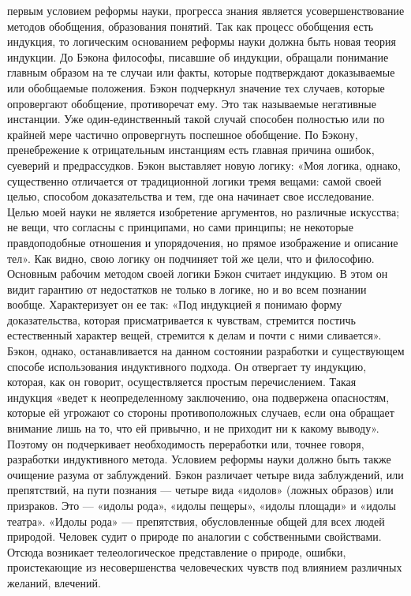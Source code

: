 \documentclass[12pt]{article}
\begin{document}
первым условием реформы науки, прогресса знания является усовершенствование методов обобщения, образования понятий.
Так как процесс обобщения есть индукция, то логическим основанием реформы науки должна 
быть новая теория индукции.
До Бэкона философы, писавшие об индукции, обращали понимание главным образом на те случаи или
факты, которые подтверждают доказываемые или обобщаемые положения. Бэкон подчеркнул значение тех
случаев, которые опровергают обобщение, противоречат ему. Это так называемые негативные инстанции.
Уже один-единственный такой случай способен полностью или по крайней мере частично опровергнуть
поспешное обобщение. По Бэкону, пренебрежение к отрицательным инстанциям есть главная причина ошибок,
суеверий и предрассудков.
Бэкон выставляет новую логику: «Моя логика, однако, существенно отличается от традиционной логики тремя
вещами: самой своей целью, способом доказательства и тем, где она начинает свое исследование. Целью моей
науки не является изобретение аргументов, но различные искусства; не вещи, что согласны с принципами, но
сами принципы; не некоторые правдоподобные отношения и упорядочения, но прямое изображение и описание
тел». Как видно, свою логику он подчиняет той же цели, что и философию. Основным рабочим методом своей
логики Бэкон считает индукцию. В этом он видит гарантию от недостатков не только в логике, но и во всем
познании вообще. Характеризует он ее так: «Под индукцией я понимаю форму доказательства, которая
присматривается к чувствам, стремится постичь естественный характер вещей, стремится к делам и почти с
ними сливается».
Бэкон, однако, останавливается на данном состоянии разработки и существующем способе использования
индуктивного подхода. Он отвергает ту индукцию, которая, как он говорит, осуществляется простым
перечислением. Такая индукция «ведет к неопределенному заключению, она подвержена опасностям, которые
ей угрожают со стороны противоположных случаев, если она обращает внимание лишь на то, что ей привычно,
и не приходит ни к какому выводу». Поэтому он подчеркивает необходимость переработки или, точнее говоря,
разработки индуктивного метода.
Условием реформы науки должно быть также очищение разума от заблуждений. Бэкон различает четыре вида
заблуждений, или препятствий, на пути познания — четыре вида «идолов» (ложных образов) или
призраков. Это — «идолы рода», «идолы пещеры», «идолы площади» и «идолы театра».
«Идолы рода» — препятствия, обусловленные общей для всех людей природой. Человек судит о природе по
аналогии с собственными свойствами. Отсюда возникает телеологическое представление о природе, ошибки,
проистекающие из несовершенства человеческих чувств под влиянием различных желаний, влечений.
\end{document}
